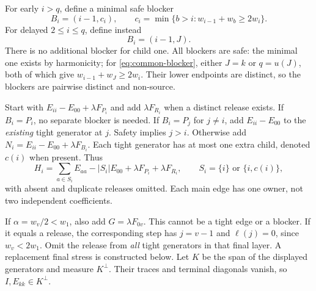 For early $i>q$, define a minimal safe blocker
\[
 B_i=(i-1,c_i),\qquad c_i=\min\{b>i:w_{i-1}+w_b\ge2w_i\}.
\]
For delayed $2\le i\le q$, define instead
\begin{equation}\label{eq:common-blocker}
 B_i=(i-1,J).
\end{equation}
There is no additional blocker for child one. All blockers are safe: the minimal one exists by harmonicity; for \eqref{eq:common-blocker}, either $J=k$ or $q=u(J)$, both of which give $w_{i-1}+w_J\ge2w_i$. Their lower endpoints are distinct, so the blockers are pairwise distinct and non-source.

Start with $E_{ii}-E_{00}+\lambda F_{P_i}$ and add $\lambda F_{R_i}$ when a distinct release exists. If $B_i=P_i$, no separate blocker is needed. If $B_i=P_j$ for $j\ne i$, add $E_{ii}-E_{00}$ to the \emph{existing} tight generator at $j$. Safety implies $j>i$. Otherwise add $N_i=E_{ii}-E_{00}+\lambda F_{B_i}$. Each tight generator has at most one extra child, denoted $c(i)$ when present. Thus
\begin{equation}\label{eq:real-generators}
 H_i=\sum_{a\in S_i}E_{aa}-|S_i|E_{00}
       +\lambda F_{P_i}+\lambda F_{R_i},
 \qquad S_i=\{i\}\text{ or }\{i,c(i)\},
\end{equation}
with absent and duplicate releases omitted. Each main edge has one owner, not two independent coefficients.

If $\alpha=w_v/2<w_1$, also add $G=\lambda F_{0v}$. This cannot be a tight edge or a blocker. If it equals a release, the corresponding step has $j=v-1$ and $\ell(j)=0$, since $w_v<2w_1$. Omit the release from \emph{all} tight generators in that final layer. A replacement final stress is constructed below. Let $K$ be the span of the displayed generators and measure $K^\perp$. Their traces and terminal diagonals vanish, so $I,E_{kk}\in K^\perp$.

